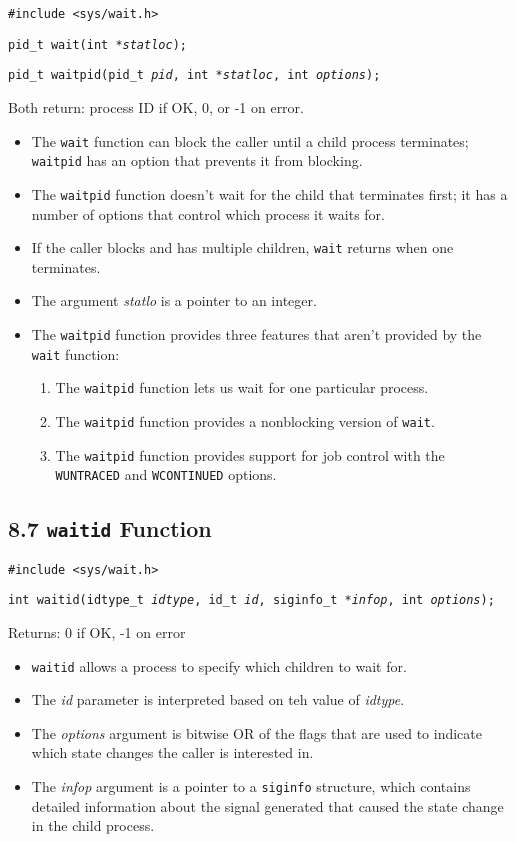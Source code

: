 \documentclass[]{article} \usepackage[all]{xy}
\newcommand{\code}{\texttt}
\begin{document}
\code{\#include <sys/wait.h>}

\code{pid\_t wait(int *\emph{statloc});}

\code{pid\_t waitpid(pid\_t \emph{pid}, int *\emph{statloc}, int
\emph{options});}

Both return: process ID if OK, 0, or -1 on error.

\begin{itemize}
\item The \code{wait} function can block the caller until a child process
terminates; \code{waitpid} has an option that prevents it from blocking.
\item The \code{waitpid} function doesn't wait for the child that terminates
first; it has a number of options that control which process it waits for.
\item If the caller blocks and has multiple children, \code{wait} returns when
one terminates.
\item The argument \emph{statlo} is a pointer to an integer.
\item The \code{waitpid} function provides three features that aren't provided
by the \code{wait} function:
\begin{enumerate}
\item The \code{waitpid} function lets us wait for one particular process.
\item The \code{waitpid} function provides a nonblocking version of \code{wait}.
\item The \code{waitpid} function provides support for job control with the
\code{WUNTRACED} and \code{WCONTINUED} options.
\end{enumerate}
\end{itemize}

\subsection*{8.7 \code{waitid} Function}
\code{\#include <sys/wait.h>}

\code{int waitid(idtype\_t \emph{idtype}, id\_t \emph{id}, siginfo\_t
*\emph{infop}, int \emph{options});}

Returns: 0 if OK, -1 on error

\begin{itemize}
\item \code{waitid} allows a process to specify which children to wait for.
\item The \emph{id} parameter is interpreted based on teh value of
\emph{idtype}.
\item The \emph{options} argument is bitwise OR of the flags that are used to
indicate which state changes the caller is interested in.
\item The \emph{infop} argument is a pointer to a \code{siginfo} structure,
which contains detailed information about the signal generated that caused the
state change in the child process.
\end{itemize}
\end{document}
